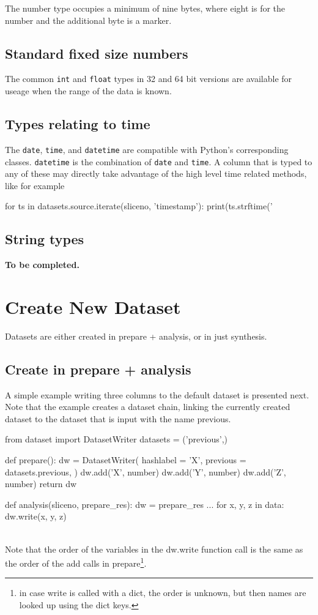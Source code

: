 The number type occupies a minimum of nine bytes, where eight is for
the number and the additional byte is a marker.


\subsection{Standard fixed size numbers}
The common \texttt{int} and \texttt{float} types in 32 and 64 bit
versions are available for useage when the range of the data is known.


\subsection{Types relating to time}
The \texttt{date}, \texttt{time}, and \texttt{datetime} are compatible
with Python's corresponding classes.  \texttt{datetime} is the
combination of \texttt{date} and \texttt{time}.  A column that is
typed to any of these may directly take advantage of the high level
time related methods, like for example

\begin{python}
  for ts in datasets.source.iterate(sliceno, 'timestamp'):
    print(ts.strftime('%
\end{python}


\subsection{String types}

\textbf{To be completed.}


\newpage
\section{Create New Dataset}
Datasets are either created in prepare + analysis, or in just
synthesis.

\subsection{Create in prepare + analysis}
A simple example writing three columns to the default dataset is
presented next.  Note that the example creates a dataset chain,
linking the currently created dataset to the dataset that is input
with the name previous.

\begin{python}
from dataset import DatasetWriter
datasets = ('previous',)

def prepare():
  dw = DatasetWriter(
    hashlabel = 'X',
    previous = datasets.previous,
  )
  dw.add('X', number)
  dw.add('Y', number)
  dw.add('Z', number)
  return dw

def analysis(sliceno, prepare_res):
  dw = prepare_res
  ...
  for x, y, z in data:
    dw.write(x, y, z)
\end{python}
\\
Note that the order of the variables in the dw.write function call is
the same as the order of the add calls in prepare\footnote{in case
  write is called with a dict, the order is unknown, but then names
  are looked up using the dict keys.}.

